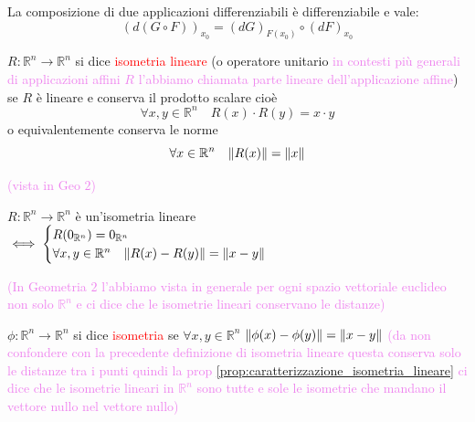         \begin{osservazione}
        La composizione di due applicazioni differenziabili è differenziabile e vale:
            \begin{equation}
            \label{eq:composizione_di_applicazioni_differenziabili}
            \left(d(G \circ F)\right)_{x_0} = \left(dG\right)_{F(x_0)} \circ \left(dF\right)_{x_0}
            \end{equation}
        \end{osservazione}
        \begin{definizione}
        $R: \mathbb{R}^n \to \mathbb{R}^n$ si dice \textcolor{red}{isometria lineare} (o operatore unitario \textcolor{violet}{in contesti più generali di applicazioni affini 
        $R$ l'abbiamo chiamata parte lineare dell'applicazione affine}) se $R$ è lineare e conserva il prodotto scalare cioè
        \[ \forall x,y \in \mathbb{R}^n \quad R(x) \cdot R(y) = x \cdot y \]
        o equivalentemente conserva le norme 
        \[ \forall x \in \mathbb{R}^n \quad \lVert R(x)\rVert = \lVert x\rVert \]
        \end{definizione}
        \begin{proposizione}\textcolor{violet}{(vista in Geo $2$)}
        \label{prop:caratterizzazione_isometria_lineare}

        $R: \mathbb{R}^n \to \mathbb{R}^n$ è un'isometria lineare $\iff
        \begin{cases} 
           R(0_{\mathbb{R}^n})=0_{\mathbb{R}^n} \\
            \forall x,y \in \mathbb{R}^n \quad \lVert R(x)-R(y)\rVert=\lVert x-y\rVert
        \end{cases}$

        \textcolor{violet}{(In Geometria $2$ l'abbiamo vista in generale per ogni spazio vettoriale euclideo non solo $\mathbb{R}^n$ e ci dice
        che le isometrie lineari conservano le distanze)}
        \end{proposizione}
        \begin{definizione}
        $\phi: \mathbb{R}^n \to \mathbb{R}^n$ si dice \textcolor{red}{isometria} se $\forall x,y \in \mathbb{R}^n$ 
        $\lVert\phi(x)-\phi(y)\rVert = \lVert x-y\rVert$ \textcolor{violet}{(da non confondere con la precedente definizione di isometria lineare questa conserva solo le distanze tra i punti 
        quindi la prop \ref{prop:caratterizzazione_isometria_lineare} ci dice che le isometrie lineari in $\mathbb{R}^n$ sono tutte e sole le isometrie che mandano il vettore
        nullo nel vettore nullo)}
        \end{definizione}
